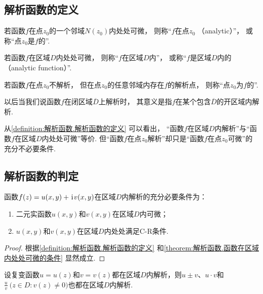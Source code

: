 \subsection{解析函数的定义}
\begin{definition}\label{definition:解析函数.解析函数的定义}
若函数\(f\)在点\(z_0\)的一个邻域\(N(z_0)\)内处处可微，
则称“\(f\)在点\(z_0\) （analytic）”，
或称“点\(z_0\)是\(f\)的”.

若函数\(f\)在区域\(D\)内处处可微，
则称“\(f\)在区域\(D\)内”，
或称“\(f\)是区域\(D\)内的（analytic function）”.

若函数\(f\)在点\(z_0\)不解析，
但在点\(z_0\)的任意邻域内存在\(f\)的解析点，
则称“点\(z_0\)为\(f\)的”.
\end{definition}
以后当我们说函数\(f\)在闭区域\(\overline{D}\)上解析时，
其意义是指\(f\)在某个包含\(\overline{D}\)的开区域内解析.

从\cref{definition:解析函数.解析函数的定义} 可以看出，
“函数\(f\)在区域\(D\)内解析”与“函数\(f\)在区域\(D\)内处处可微”等价.
但“函数\(f\)在点\(z_0\)解析”却只是“函数\(f\)在点\(z_0\)可微”的充分不必要条件.

\subsection{解析函数的判定}
\begin{theorem}\label{theorem:解析函数.函数在区域内处处解析的充分必要条件}
函数\(f(z)=u(x,y)+\kern1pt\mathrm{i}\kern1pt v(x,y)\)在区域\(D\)内解析的充分必要条件为：
\begin{enumerate}
\item 二元实函数\(u(x,y)\)和\(v(x,y)\)在区域\(D\)内可微；
\item \(u(x,y)\)和\(v(x,y)\)在区域\(D\)内处处满足C-R条件.
\end{enumerate}
\begin{proof}
根据\cref{definition:解析函数.解析函数的定义} 和\cref{theorem:解析函数.函数在区域内处处可微的条件} 显然成立.
\end{proof}
\end{theorem}

\begin{theorem}\label{theorem:解析函数.函数的和差积商的解析性}
设复变函数\(u=u(z)\)和\(v=v(z)\)都在区域\(D\)内解析，则\(u \pm v\)、\(u \cdot v\)和\(\frac{u}{v}\ \bigl( z \in D : v(z) \neq 0 \bigr)\)也都在区域\(D\)内解析.
\end{theorem}

